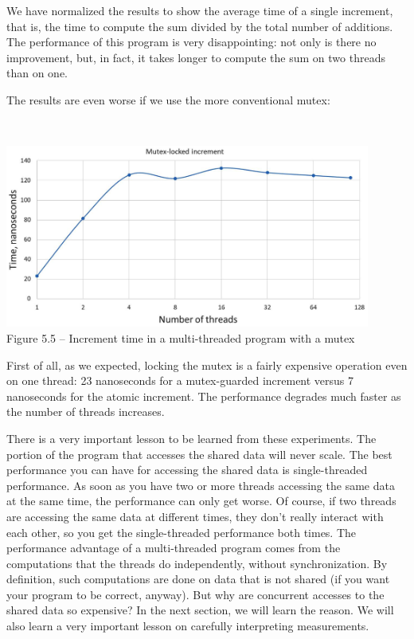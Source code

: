 We have normalized the results to show the average time of a single increment, that is, the time to compute the sum divided by the total number of additions. The performance of this program is very disappointing: not only is there no improvement, but, in fact, it takes longer to compute the sum on two threads than on one.

The results are even worse if we use the more conventional mutex:

\hspace*{\fill} \\ %
\begin{center}
\includegraphics[width=0.9\textwidth]{content/1/chapter5/images/5.jpg}\\
Figure 5.5 – Increment time in a multi-threaded program with a mutex
\end{center}

First of all, as we expected, locking the mutex is a fairly expensive operation even on one thread: 23 nanoseconds for a mutex-guarded increment versus 7 nanoseconds for the atomic increment. The performance degrades much faster as the number of threads increases.

There is a very important lesson to be learned from these experiments. The portion of the program that accesses the shared data will never scale. The best performance you can have for accessing the shared data is single-threaded performance. As soon as you have two or more threads accessing the same data at the same time, the performance can only get worse. Of course, if two threads are accessing the same data at different times, they don't really interact with each other, so you get the single-threaded performance both times. The performance advantage of a multi-threaded program comes from the computations that the threads do independently, without synchronization. By definition, such computations are done on data that is not shared (if you want your program to be correct, anyway). But why are concurrent accesses to the shared data so expensive? In the next section, we will learn the reason. We will also learn a very important lesson on carefully interpreting measurements.








